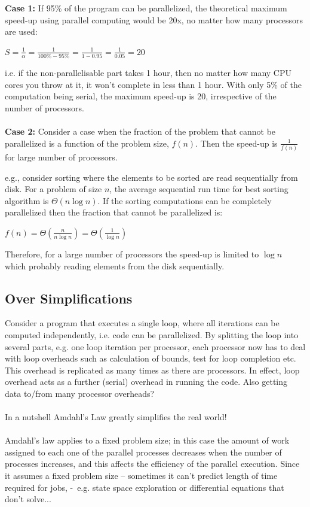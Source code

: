 \documentclass[a4paper]{article}
\begin{document}
\noindent
\textbf{Case 1:} If 95\% of the program can be parallelized, the theoretical maximum speed-up using parallel computing would be 20x, no matter how many processors are used: 
\begin{center}
{\large $S = \frac{1}{\alpha} = \frac{1}{100\% - 95\%} = \frac{1}{1 - 0.95} = \frac{1}{0.05} = 20$}
\end{center}
i.e. if the non-parallelisable part takes 1 hour, then no matter how many CPU cores you throw at it, it won't complete in less than 1 hour. With only 5\% of the computation being serial, the maximum speed-up is 20, irrespective of the number of processors.
\\
\\
\noindent
\textbf{Case 2:} Consider a case when the fraction of the problem that cannot be parallelized is a function of the problem size, $f(n)$. Then the speed-up is {\large $\frac{1}{f(n)}$} for large number of processors.

\noindent
e.g., consider sorting where the elements to be sorted are read sequentially from disk. For a problem of size $n$, the average sequential run time for best sorting algorithm is $\Theta(n\log{}n)$. If the sorting computations can be completely parallelized then the fraction that cannot be parallelized is:

\begin{center}
{\large $f(n) = \Theta(\frac{n}{n\log{}n}) = \Theta(\frac{1}{\log{}n})$}
\end{center}

\noindent
Therefore, for a large number of processors the speed-up is limited to $\log{}n$ which probably reading elements from the disk sequentially.

\subsection{Over Simplifications}
Consider a program that executes a single loop, where all iterations can be computed independently, i.e. code can be parallelized. By splitting the loop into several parts, e.g. one loop iteration per processor, each processor now has to deal with loop overheads such as calculation of bounds, test for loop completion etc. This overhead is replicated as many times as there are processors. In effect, loop overhead acts as a further (serial) overhead in running the code. Also getting data to/from many
processor overheads? 
\\
\\
In a nutshell Amdahl's Law greatly simplifies the real world!
\\
\\
Amdahl's law applies to a fixed problem size; in this case the amount of work assigned to each one of
the parallel processes decreases when the number of processes increases, and this affects the efficiency of the parallel execution.
\noindent
Since it assumes a fixed problem size – sometimes it can't predict length of time required for jobs,
-  e.g. state space exploration or differential equations that don't solve...
\end{document}
